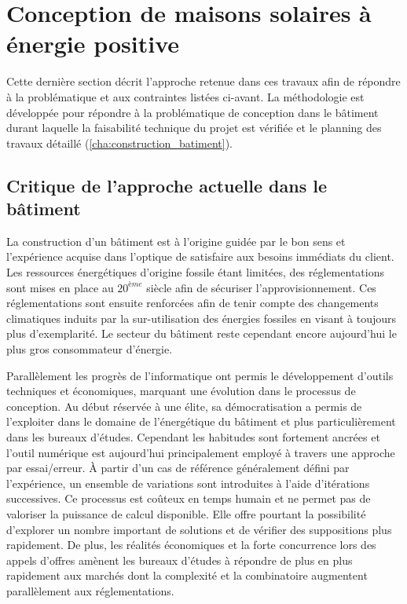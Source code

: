\section{Conception de maisons solaires à énergie positive} %
\label{sec:conception_de_maisons_solaires_a_energie_positive}
Cette dernière section décrit l’approche retenue dans ces travaux afin de répondre à la
problématique et aux contraintes listées ci-avant. La méthodologie est développée pour
répondre à la problématique de conception dans le bâtiment durant
laquelle la faisabilité technique du projet est vérifiée et le planning des travaux
détaillé (\ref{cha:construction_batiment}).

\subsection{Critique de l’approche actuelle dans le bâtiment} %
\label{sub:critique_de_l_approche_actuelle_dans_le_batiment}
La construction d’un bâtiment est à l’origine guidée par le bon sens et l’expérience
acquise dans l’optique de satisfaire aux besoins immédiats du client.
Les ressources énergétiques d’origine fossile étant limitées, des
réglementations sont mises en place au $20^{ème}$ siècle afin de sécuriser
l’approvisionnement. Ces réglementations sont ensuite renforcées afin de tenir
compte des changements climatiques induits par la sur-utilisation des énergies
fossiles en visant à toujours plus d’exemplarité. Le secteur du bâtiment reste
cependant encore aujourd’hui le plus gros consommateur d’énergie.

Parallèlement les progrès de l’informatique ont permis le développement d’outils
techniques et économiques, marquant une évolution dans le processus de conception.
Au début réservée à une élite, sa démocratisation a permis de l’exploiter dans le domaine de
l’énergétique du bâtiment et plus particulièrement dans les bureaux d’études. Cependant
les habitudes sont fortement ancrées et l’outil numérique est aujourd’hui principalement
employé à travers une approche par essai/erreur. À partir d’un cas de référence
généralement défini par l’expérience, un ensemble de variations sont introduites à l’aide
d’itérations successives. Ce processus est coûteux en temps humain et ne permet pas de
valoriser la puissance de calcul disponible. Elle offre pourtant la possibilité d’explorer
un nombre important de solutions et de vérifier des suppositions plus rapidement. De plus,
les réalités économiques et la forte concurrence lors des appels d’offres amènent les
bureaux d’études à répondre de plus en plus rapidement aux marchés dont la complexité et
la combinatoire augmentent parallèlement aux réglementations.

